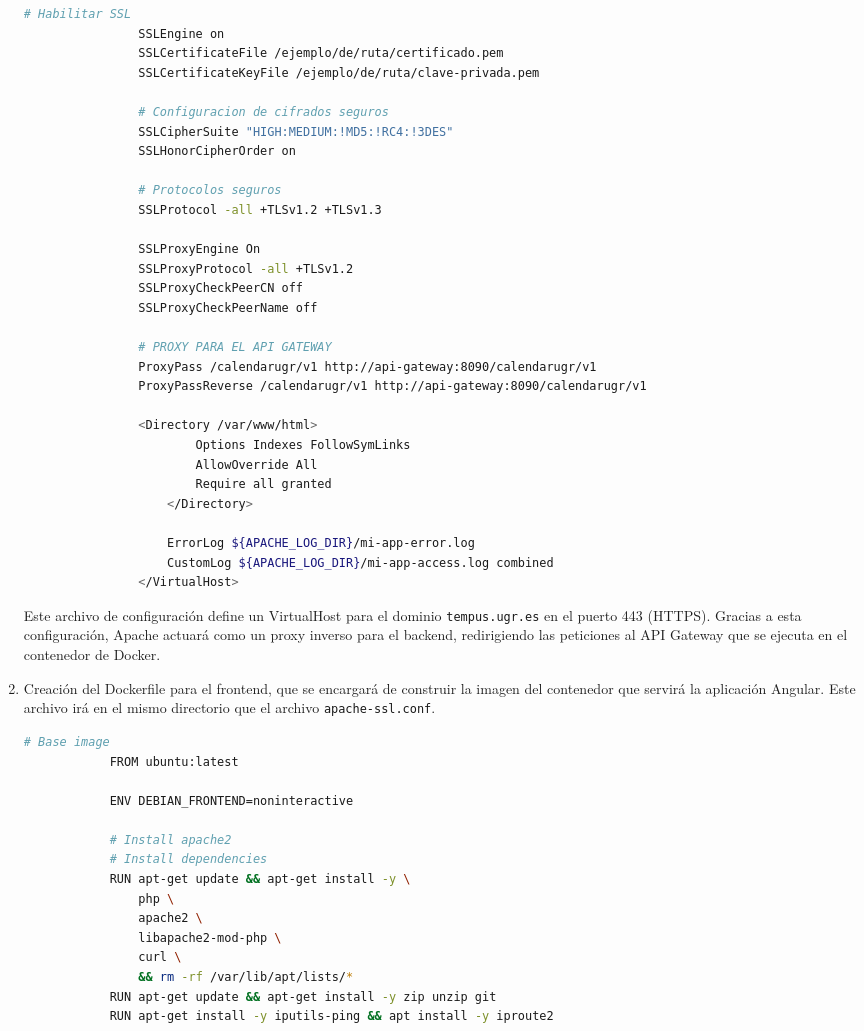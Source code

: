 \begin{enumerate}
\begin{lstlisting}[language=bash]
                # Habilitar SSL
                SSLEngine on
                SSLCertificateFile /ejemplo/de/ruta/certificado.pem                
                SSLCertificateKeyFile /ejemplo/de/ruta/clave-privada.pem

                # Configuracion de cifrados seguros
                SSLCipherSuite "HIGH:MEDIUM:!MD5:!RC4:!3DES"
                SSLHonorCipherOrder on

                # Protocolos seguros
                SSLProtocol -all +TLSv1.2 +TLSv1.3

                SSLProxyEngine On
                SSLProxyProtocol -all +TLSv1.2
                SSLProxyCheckPeerCN off
                SSLProxyCheckPeerName off

                # PROXY PARA EL API GATEWAY
                ProxyPass /calendarugr/v1 http://api-gateway:8090/calendarugr/v1
                ProxyPassReverse /calendarugr/v1 http://api-gateway:8090/calendarugr/v1

                <Directory /var/www/html>
                        Options Indexes FollowSymLinks
                        AllowOverride All
                        Require all granted
                    </Directory>

                    ErrorLog ${APACHE_LOG_DIR}/mi-app-error.log
                    CustomLog ${APACHE_LOG_DIR}/mi-app-access.log combined
                </VirtualHost>
        \end{lstlisting}
        Este archivo de configuración define un VirtualHost para el dominio \texttt{tempus.ugr.es} en el puerto 443 (HTTPS).
        \newline 
        Gracias a esta configuración, Apache actuará como un proxy inverso para el backend, redirigiendo las peticiones al API Gateway que se ejecuta en el contenedor de Docker.
    \item Creación del Dockerfile para el frontend, que se encargará de construir la imagen del contenedor que servirá la aplicación Angular. Este archivo irá en el mismo directorio que el archivo \texttt{apache-ssl.conf}.
        \begin{lstlisting}[language=bash]
            # Base image
            FROM ubuntu:latest

            ENV DEBIAN_FRONTEND=noninteractive

            # Install apache2
            # Install dependencies
            RUN apt-get update && apt-get install -y \
                php \
                apache2 \
                libapache2-mod-php \
                curl \
                && rm -rf /var/lib/apt/lists/*
            RUN apt-get update && apt-get install -y zip unzip git
            RUN apt-get install -y iputils-ping && apt install -y iproute2


\end{lstlisting}
\end{enumerate}
